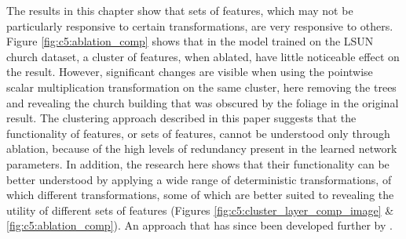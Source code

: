 The results in this chapter show that sets of features, which may not be particularly responsive to certain transformations, are very responsive to others. 
Figure \ref{fig:c5:ablation_comp} shows that in the model trained on the LSUN church dataset, a cluster of features, when ablated, have little noticeable effect on the result.
However, significant changes are visible when using the pointwise scalar multiplication transformation on the same cluster, here removing the trees and revealing the church building that was obscured by the foliage in the original result. 
The clustering approach described in this paper suggests that the functionality of features, or sets of features, cannot be understood only through ablation, because of the high levels of redundancy present in the learned network parameters. 
In addition, the research here shows that their functionality can be better understood by applying a wide range of deterministic transformations, of which different transformations, some of which are better suited to revealing the utility of different sets of features (Figures \ref{fig:c5:cluster_layer_comp_image} \& \ref{fig:c5:ablation_comp}). 
An approach that has since been developed further by \cite{oldfield2022panda,oldfield2024bilinear}.

